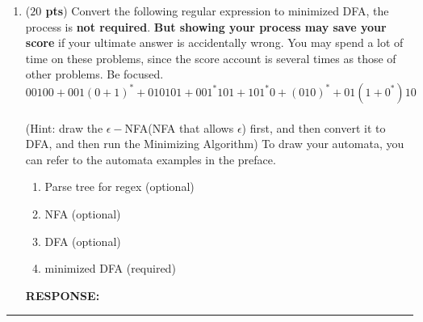 \documentclass[10pt]{article}
\newcommand {\pts}[1]{({\bf #1 pts})}
\newcommand {\response}{{\color{blue}\textbf{RESPONSE:}\\}}
\begin{document}
\begin{enumerate}
\begin{enumerate}
\begin{figure}[h]
	      		\caption{$A_2$}
	      		\label{fig:tkiza2}
	      	\end{figure}
	      	\\\response
	      \end{enumerate}
	      \newpage
	\item \pts{$20$} Convert the following regular expression to minimized DFA, the process is \textbf{not required}. \textbf{But showing your process may save your score} if your ultimate answer is accidentally wrong. You may spend a lot of time on these problems, since the score account is several times as those of other problems. Be focused.
	      $$00100+001(0+1)^*+010101+001^*101+101^*0+(010)^*+01(1+0^*)10$$\\(Hint: draw the $\epsilon-$NFA(NFA that allows $\epsilon$) first, and then convert it to DFA, and then run the Minimizing Algorithm) To draw your automata, you can refer to the automata examples in the preface.\\
	              
	      \begin{enumerate}
	      	\item Parse tree for regex (optional)
	      	\item NFA (optional)
	      	\item DFA (optional)
	      	\item minimized DFA (required)
	      \end{enumerate}
	      \response
\end{enumerate}
\vfill
\hrule
{}
\end{document}
